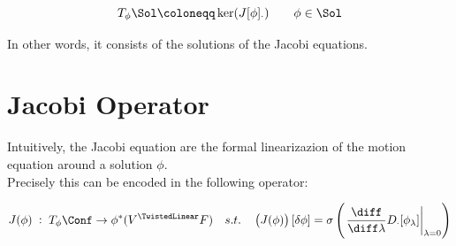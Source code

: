 \documentclass[a4paper,12pt]{scrartcl}  %
\begin{document}
	\begin{definition}\label{Def:TangentSol}
		\begin{displaymath}
			T_\phi \Sol \coloneqq \ker(J[\phi]_\cdot) \qquad \phi \in \Sol
		\end{displaymath}
	\end{definition}
In other words, it consists of the solutions of the Jacobi equations.

\section{Jacobi Operator}\label{Sec:JacobiOperator}
Intuitively, the Jacobi equation are the formal linearizazion of the motion equation around a solution $\phi$.\\
Precisely this can be encoded in the following operator:

	\begin{definition}\label{Def:JacobiOp}
		\begin{displaymath}
			J(\phi) \; : \; T_\phi \Conf \rightarrow	\phi^\ast(V^\TwistedLinear F) 
			\quad s.t. \quad  \left(J(\phi)\right) [ \delta\phi ]
			= \sigma \left( \left.\dfrac{\diff}{\diff \lambda} D_\cdot [\phi_\lambda]\right\rvert_{\lambda=0} \right)
		\end{displaymath}
	\end{definition}
\end{document}
